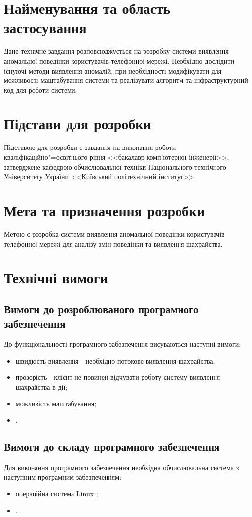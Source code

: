 \documentclass[ukrainian,utf8,pointsubsection,simple]{eskdtext}
\begin{document}
\newpage
{}
\tableofcontents
\newpage

\section{Найменування та область застосування}
Дане технічне завдання розповсюджується на розробку системи виявлення аномальної поведінки користувачів телефонної мережі. Необхідно дослідити існуючі методи виявлення аномалій, при необхідності модифікувати для можливості маштабування системи та реалізувати алгоритм та інфраструктурний код для роботи системи.

\section{Підстави для розробки}
Підставою для розробки є завдання на виконання роботи кваліфікаційно"=освітнього
рівня <<бакалавр комп'ютерної інженерії>>, затверджене кафедрою обчислювальної
техніки Національного технічного Університету України <<Київський політехнічний
інститут>>.

\section{Мета та призначення розробки}
Метою є розробка системи виявлення аномальної поведінки користувачів телефонної мережі для аналізу змін поведінки та виявлення шахрайства.

\section{Технічні вимоги}
\subsection{Вимоги до розроблюваного програмного забезпечення}
До функціональності програмного забезпечення висуваються наступні вимоги:

\begin{itemize}
  \item швидкість виявлення - необхідно потокове виявлення шахрайства;
  \item прозорість - клієнт не повинен відчувати роботу систему виявлення шахрайства в дії;
  \item можливість маштабування;
  \item .
\end{itemize}


\subsection{Вимоги до складу програмного забезпечення}
Для виконання програмного забезпечення необхідна обчислювальна система з
наступним програмним забезпеченням:
\begin{itemize}
\item операційна система Linux \TBD;

\item \TBD.
\end{itemize}
\end{document}
